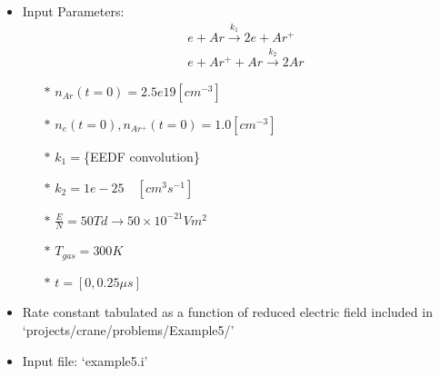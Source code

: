 \begin{frame}[fragile]
	\frametitle{\insertsubsectionhead}
	\begin{itemize}
		\item Input Parameters:
		\begin{align*}
				&e + Ar \xrightarrow{k_1} 2e + Ar^+  \\
				&e + Ar^+ + Ar \xrightarrow{k_2} 2Ar  
			\end{align*}
		\begin{itemize}
			\item[$\ast$] $n_{Ar}(t=0) = 2.5e19 [cm^{-3}]$
			\item[$\ast$] $n_{e}(t=0), n_{Ar^+}(t=0) = 1.0 [cm^{-3}]$
			\item[$\ast$] $k_1 = $\{EEDF convolution\}
			\item[$\ast$] $k_2 = 1e-25 \quad [cm^3 s^{-1}]$
			\item[$\ast$] $\tfrac{E}{N} = 50 Td \rightarrow 50\times 10^{-21} V m^2$
			\item[$\ast$] $T_{gas} = 300 K$ 
			\item[$\ast$] $t=[0,0.25 \mu s]$
		\end{itemize}
	\item Rate constant tabulated as a function of reduced electric field included in `projects/crane/problems/Example5/'
	\item Input file: `example5.i'
	\end{itemize}
\end{frame}

%
%    

